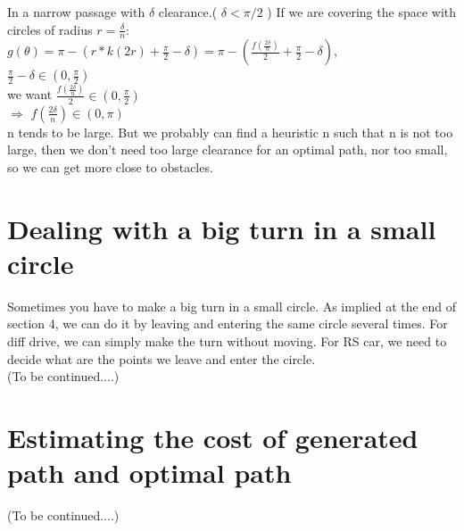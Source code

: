 \documentclass[12pt]{article}
\begin{document}
  In a narrow passage with $\delta$ clearance.( $\delta<\pi / 2$ ) If we are covering the space with circles of radius $r = \frac{\delta}{n}$:\\
  
  $g(\theta) = \pi - (r*k(2r) + \frac{\pi}{2} - \delta) = \pi - ( \frac{f(\frac{2\delta}{n})}{2} + \frac{\pi}{2} - \delta )$,\\
  
  $\frac{\pi}{2} - \delta \in (0, \frac{\pi}{2})$\\
  
  we want $\frac{f(\frac{2\delta}{n})}{2} \in (0, \frac{\pi}{2})$\\
  
  $\Longrightarrow$ $f(\frac{2\delta}{n}) \in (0, \pi)$\\
  
  n tends to be large. But we probably can find a heuristic n such that n is not too large, then we don't need too large clearance for an optimal path, nor too small, so we can get more close to obstacles.
  
  \section{Dealing with a big turn in a small circle }
  
  Sometimes you have to make a big turn in a small circle. As implied at the end of section 4, we can do it by leaving and entering the same circle several times. For diff drive, we can simply make the turn without moving. For RS car, we need to decide what are the points we leave and enter the circle.\\
  
  (To be continued....)
  
  \section{Estimating the cost of generated path and optimal path}
  
  (To be continued....)
\end{document}
